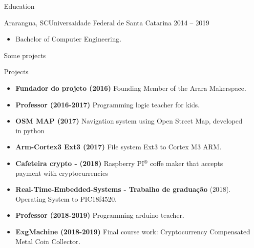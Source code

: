 \documentclass[]{mcdowellcv}
\begin{document}
	\begin{cvsection}{Education}
		\begin{cvsubsection}{Ararangua, SC}{Universaidade Federal de Santa Catarina}{ 2014 -- 2019}
			~\\
			\begin{itemize}
				\item Bachelor of Computer Engineering.
			\end{itemize}
		\end{cvsubsection}
	\end{cvsection}

	\begin{cvsection}{Some projects}
		\begin{cvsubsection}{Projects}{}{}
			\begin{itemize}
				\item \textbf{Fundador do projeto (2016)} Founding Member of the Arara Makerspace.
				\item \textbf{Professor (2016-2017)} Programming logic teacher for kids.
				\item \textbf{OSM MAP (2017)} Navigation system using Open Street Map, developed in python
				\item \textbf{Arm-Cortex3 Ext3 (2017)} File system Ext3 to Cortex M3 ARM.
        \item \textbf{Cafeteira crypto - (2018)} Raspberry PI$^®$ coffe maker that accepts payment with cryptocurrencies
				\item \textbf{Real-Time-Embedded-Systems - Trabalho de graduação} (2018). Operating System to PIC18f4520.
				\item \textbf{Professor (2018-2019)} Programming arduino teacher.
				\item \textbf{ExgMachine (2018-2019)} Final course work: Cryptocurrency Compensated Metal Coin Collector.
			\end{itemize}
		\end{cvsubsection}
	\end{cvsection}
\end{document}
